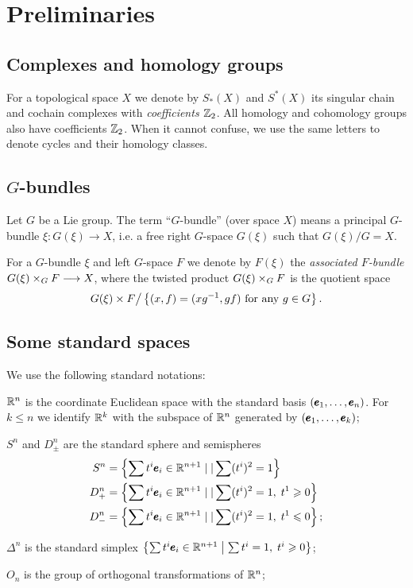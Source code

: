 \documentclass{article}
\begin{document}
\section{Preliminaries }
\subsection{Complexes and homology groups }
For a topological space $X$ we denote by $S_*(X)$ and $S^*(X)$
its singular chain and cochain complexes with {\it coefficients
$\mathbb Z_2$}. All homology and cohomology groups also have 
coefficients $\mathbb Z_2$. When it cannot confuse, we use the same letters
to denote cycles and their homology classes.
\subsection{$G$-bundles }
Let $G$ be a Lie group. The term ``$G$-bundle'' (over space $X$)
means a principal $G$-bundle $\xi:G(\xi)\to X$, i.e. a free
right $G$-space $G(\xi)$ such that $G(\xi)/G=X$.

For a $G$-bundle $\xi$ and left $G$-space $F$ we denote by
$F(\xi)$ the {\it associated $F$-bundle\/} $G(\xi)\times_GF\longrightarrow X$,
where the twisted product $G(\xi)\times_GF$ is the quotient space
$$
G(\xi)\times F\big/\left\{(x,f)=(xg^{-1},gf)\text{ for any }g\in G \right\}.
$$
\subsection{Some standard spaces }
We use the following standard notations:

$\mathbb R^n$ is the coordinate Euclidean space with the
standard basis $({\pmb e}_1,\dots,{\pmb e}_n)$. For $k\le n$ we identify
$\mathbb R^k$ with the subspace of $\mathbb R^n$ generated by $({\pmb e}_1,\dots,{\pmb e}_k)$;

$S^n$ and $D_{\pm}^n$ are the standard sphere and semispheres
\begin{align}
S^n&=\left\{\sum t^i{\pmb e}_i\in\mathbb R^{n+1}\mid|\sum(t^i)^2=1\right\}\\
D_+^n&=\left\{\sum t^i{\pmb e}_i\in\mathbb R^{n+1}\mid|\sum(t^i)^2=1,\;t^1\geqslant0\right\}\\
D_-^n&=\left\{\sum t^i{\pmb e}_i\in\mathbb R^{n+1}\mid|\sum(t^i)^2=1,\;t^1\leqslant0\right\};
\end{align}


$\Delta^n$ is the standard simplex
$\bigl\{\sum t^i{\pmb e}_i\in\mathbb R^{n+1}\bigm|\sum t^i=1,\;t^i\geqslant0\bigr\}$;

$O_n$ is the group of orthogonal transformations of $\mathbb R^n$;
\end{document}
